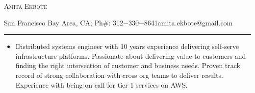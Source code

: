 \documentclass[10pt,oneside]{article}
\makeatletter
\newcommand{\name}{Amita Ekbote}
\newcommand{\addr}{San Francisco Bay Area, CA}
\newcommand{\phone}{312$-$330$-$8641}
\newcommand{\email}{amita.ekbote@gmail.com}
\newcommand{\bigname}[1]{\begin{center}\Huge\scshape#1\end{center}}
\newcommand{\subheader}[1]{\textsc{\textbf{\large{#1}}}}
\makeatother
\begin{document}
\bigname{\name}
{\small \addr; Ph#: \phone\hfill\email}
\vspace{0pt}
\rule[3mm]{\textwidth}{1pt}

\vspace{-10 pt}

{\flushleft{\subheader{Summary}}}
    \vspace{-4 pt}
   \begin{itemize}

    \item Distributed systems engineer with 10 years experience delivering self-serve infrastructure platforms.
     Passionate about delivering value to customers and finding the right intersection of customer and business needs.
    Proven track record of strong collaboration with cross org teams to deliver results.
    Experience with being on call for tier 1 services on AWS.
    \end{itemize}

\end{document}
